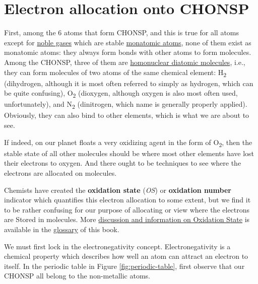 \documentclass[]{book}
\theoremstyle{definition}
\theoremstyle{definition}
\theoremstyle{definition}
\theoremstyle{remark}
\begin{document}
\section{Electron allocation onto
CHONSP}\label{electron-allocation-onto-chonsp}

First, among the 6 atoms that form CHONSP, and this is true for all
atoms except for \href{https://en.wikipedia.org/wiki/Noble_gas}{noble
gases} which are stable
\href{https://en.wikipedia.org/wiki/Monatomic_gas}{monatomic atoms},
none of them exist as monatomic atoms: they always form bonds with other
atoms to form molecules. Among the CHONSP, three of them are
\href{https://en.wikipedia.org/wiki/Diatomic_molecule}{homonuclear
diatomic molecules}, i.e., they can form molecules of two atoms of the
same chemical element: H\textsubscript{2} (dihydrogen, although it is
most often referred to simply as hydrogen, which can be quite
confusing), O\textsubscript{2} (dioxygen, although oxygen is also most
often used, unfortunately), and N\textsubscript{2} (dinitrogen, which
name is generally properly applied). Obviously, they can also bind to
other elements, which is what we are about to see.

If indeed, on our planet floats a very oxidizing agent in the form of
O\textsubscript{2}, then the stable state of all other molecules should
be where most other elements have lost their electrons to oxygen. And
there ought to be techniques to see where the electrons are allocated on
molecules.

Chemists have created the \textbf{oxidation state} (\emph{OS}) or
\textbf{oxidation number} indicator which quantifies this electron
allocation to some extent, but we find it to be rather confusing for our
purpose of allocating or view where the electrons are Stored in
molecules. More \protect\hyperlink{oxidation-state}{discussion and
information on Oxidation State} is available in the
\protect\hyperlink{glossary}{glossary} of this book.

We must first lock in the electronegativity concept. Electronegativity
is a chemical property which describes how well an atom can attract an
electron to itself. In the periodic table in Figure
\ref{fig:periodic-table}, first observe that our CHONSP all belong to
the non-metallic atoms.
\end{document}
